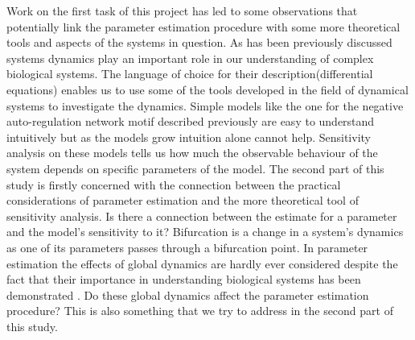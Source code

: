 Work on the first task of this project has led to some observations that potentially link the parameter estimation procedure with some more theoretical tools and aspects of the systems in question.  
As has been previously discussed systems dynamics play an important role in our understanding of complex biological systems. The language of choice for their description(differential equations) enables us to use some of the tools developed in the field of dynamical systems to investigate the dynamics. Simple models like the one for the negative auto-regulation network motif described previously are easy to understand intuitively but as the models grow intuition alone cannot help. Sensitivity analysis on these models tells us how much the observable behaviour of the system depends on specific parameters of the model. The second part of this study is firstly concerned with the connection between the practical considerations of parameter estimation and the more theoretical tool of sensitivity analysis. Is there a connection between the estimate for a parameter and the model's sensitivity to it? Bifurcation is a change in a system's dynamics as one of its parameters passes through a bifurcation point. In parameter estimation the effects of global dynamics are hardly ever considered despite the fact that their importance in understanding biological systems has been demonstrated \cite{}. Do these global dynamics affect the parameter estimation procedure? This is also something that we try to address in the second part of this study.



